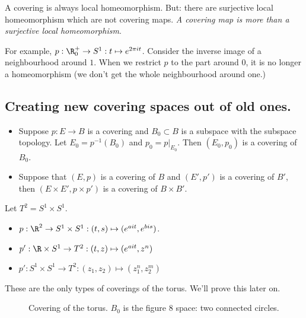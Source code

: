 \begin{remark}
A covering is always local homeomorphism.
But: there are surjective local homeomorphism which are not covering maps.
\emph{A covering map is more than a surjective local homeomorphism}.

For example, $p: \R_0^{+} \to  S^{1}: t \mapsto  e^{2\pi i t}$. Consider the inverse image of a neighbourhood around $1$. When we restrict $p$ to the part around $0$, it is no longer a homeomorphism (we don't get the whole neighbourhood around one.)
\end{remark}

\subsection*{Creating new covering spaces out of old ones.}

\begin{itemize}
    \item Suppose $p: E \to  B$ is a covering and $B_0 \subset B$ is a subspace with the subspace topology.
        Let $E_0 = p^{-1}(B_0)$ and $p_0 = p|_{E_0}$.
        Then $(E_0, p_0)$ is a covering of $B_0$.

    \item Suppose that $(E, p)$ is a covering of $B$ and $(E', p')$ is a covering of $B'$, then $(E\times E', p\times p')$ is a covering of $B \times B'$.
\end{itemize}

\begin{eg}
    Let $T^{2} = S^{1} \times S^{1}$.

    \begin{itemize}
        \item $p: \R^2 \to  S^{1} \times S^{1}: (t, s) \mapsto  (e^{a i t}, e^{b i s})$.
        \item $p': \R \times S^{1} \to  T^{2}: (t, z) \mapsto (e^{a i t}, z^{n})$
        \item $p': S^{1} \times S^{1} \to  T^{2}: (z_1, z_2) \mapsto (z_1^{n}, z_2^{m})$
    \end{itemize}
    These are the only types of coverings of the torus. We'll prove this later on.
\end{eg}

\begin{figure}[H]
    \centering
    \caption{Covering of the torus. $B_0$ is the figure $8$ space: two connected circles.}
    \label{fig:torus-covering}
\end{figure}

